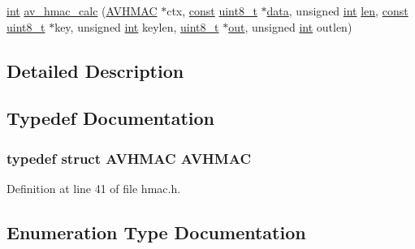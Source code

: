 \begin{DoxyCompactItemize}
\hyperlink{xmltok_8h_a5a0d4a5641ce434f1d23533f2b2e6653}{int} \hyperlink{group__lavu__hmac_ga22d17ebca8556c49be5c22e706de1ab3}{av\+\_\+hmac\+\_\+calc} (\hyperlink{group__lavu__hmac_gad8c944f9437e65d8e8ebc526bdeee676}{A\+V\+H\+M\+AC} $\ast$ctx, \hyperlink{getopt1_8c_a2c212835823e3c54a8ab6d95c652660e}{const} \hyperlink{lib-src_2ffmpeg_2win32_2stdint_8h_a9a941819355e6f658991890ff66b4b0e}{uint8\+\_\+t} $\ast$\hyperlink{lib_2expat_8h_ac39e72a1de1cb50dbdc54b08d0432a24}{data}, unsigned \hyperlink{xmltok_8h_a5a0d4a5641ce434f1d23533f2b2e6653}{int} \hyperlink{lib_2expat_8h_af86d325fecfc8f47b61fbf5a5146f582}{len}, \hyperlink{getopt1_8c_a2c212835823e3c54a8ab6d95c652660e}{const} \hyperlink{lib-src_2ffmpeg_2win32_2stdint_8h_a9a941819355e6f658991890ff66b4b0e}{uint8\+\_\+t} $\ast$key, unsigned \hyperlink{xmltok_8h_a5a0d4a5641ce434f1d23533f2b2e6653}{int} keylen, \hyperlink{lib-src_2ffmpeg_2win32_2stdint_8h_a9a941819355e6f658991890ff66b4b0e}{uint8\+\_\+t} $\ast$\hyperlink{latency_8c_a71fd1c281affec034757279e4f91c50b}{out}, unsigned \hyperlink{xmltok_8h_a5a0d4a5641ce434f1d23533f2b2e6653}{int} outlen)
\end{DoxyCompactItemize}


\subsection{Detailed Description}


\subsection{Typedef Documentation}
\subsubsection[{\texorpdfstring{A\+V\+H\+M\+AC}{AVHMAC}}]{\setlength{\rightskip}{0pt plus 5cm}typedef struct {\bf A\+V\+H\+M\+AC} {\bf A\+V\+H\+M\+AC}}\hypertarget{group__lavu__hmac_gad8c944f9437e65d8e8ebc526bdeee676}{}\label{group__lavu__hmac_gad8c944f9437e65d8e8ebc526bdeee676}


Definition at line 41 of file hmac.\+h.



\subsection{Enumeration Type Documentation}

